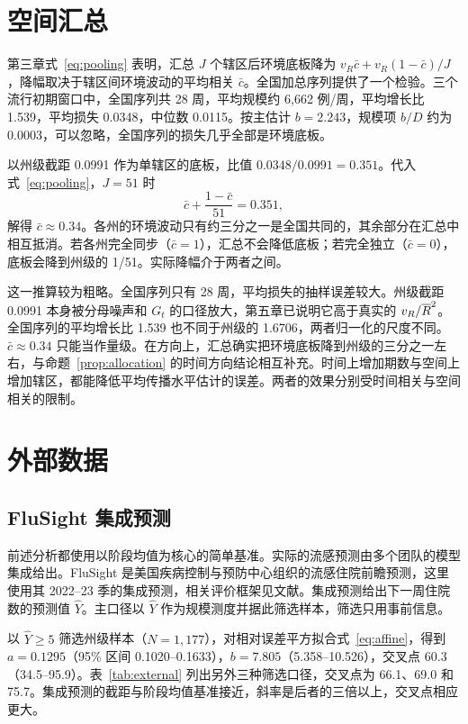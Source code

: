 \section{空间汇总}
\label{sec:rob-pool}

第三章式~\eqref{eq:pooling} 表明，汇总 $J$ 个辖区后环境底板降为 $v_R\bar c+v_R(1-\bar c)/J$，降幅取决于辖区间环境波动的平均相关 $\bar c$。全国加总序列提供了一个检验。三个流行初期窗口中，全国序列共 28 周，平均规模约 6,662 例/周，平均增长比 1.539，平均损失 0.0348，中位数 0.0115。按主估计 $b=2.243$，规模项 $b/D$ 约为 0.0003，可以忽略，全国序列的损失几乎全部是环境底板。

以州级截距 0.0991 作为单辖区的底板，比值 $0.0348/0.0991=0.351$。代入式~\eqref{eq:pooling}，$J=51$ 时
\begin{equation}
  \bar c+\frac{1-\bar c}{51}=0.351 ,
  \label{eq:cbar}
\end{equation}
解得 $\bar c\approx0.34$。各州的环境波动只有约三分之一是全国共同的，其余部分在汇总中相互抵消。若各州完全同步（$\bar c=1$），汇总不会降低底板；若完全独立（$\bar c=0$），底板会降到州级的 1/51。实际降幅介于两者之间。

这一推算较为粗略。全国序列只有 28 周，平均损失的抽样误差较大。州级截距 0.0991 本身被分母噪声和 $G_t$ 的口径放大，第五章已说明它高于真实的 $v_R/\overline{R}^2$。全国序列的平均增长比 1.539 也不同于州级的 1.6706，两者归一化的尺度不同。$\bar c\approx0.34$ 只能当作量级。在方向上，汇总确实把环境底板降到州级的三分之一左右，与命题~\ref{prop:allocation} 的时间方向结论相互补充。时间上增加期数与空间上增加辖区，都能降低平均传播水平估计的误差。两者的效果分别受时间相关与空间相关的限制。

\section{外部数据}
\label{sec:rob-external}

\subsection{FluSight 集成预测}

前述分析都使用以阶段均值为核心的简单基准。实际的流感预测由多个团队的模型集成给出。FluSight 是美国疾病控制与预防中心组织的流感住院前瞻预测，这里使用其 2022--23 季的集成预测\citep{mathis2024evaluation}，相关评价框架见文献\citep{reich2019accuracy, cramer2022evaluation}。集成预测给出下一周住院数的预测值 $\widehat Y$。主口径以 $\widehat Y$ 作为规模测度并据此筛选样本，筛选只用事前信息。

以 $\widehat Y\geq5$ 筛选州级样本（$N=1{,}177$），对相对误差平方拟合式~\eqref{eq:affine}，得到 $a=0.1295$（95\% 区间 0.1020--0.1633），$b=7.805$（5.358--10.526），交叉点 60.3（34.5--95.9）。表~\ref{tab:external} 列出另外三种筛选口径，交叉点为 66.1、69.0 和 75.7。集成预测的截距与阶段均值基准接近，斜率是后者的三倍以上，交叉点相应更大。

